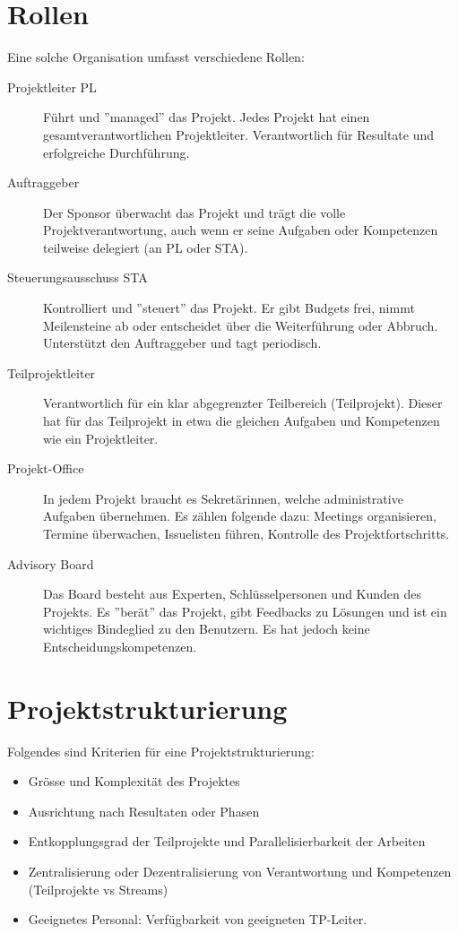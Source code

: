 \section{Rollen}
Eine solche Organisation umfasst verschiedene Rollen:
\begin{description}
	\item[Projektleiter PL] Führt und ''managed'' das Projekt. Jedes Projekt hat einen gesamtverantwortlichen Projektleiter. Verantwortlich für Resultate und erfolgreiche Durchführung.
	\item[Auftraggeber] Der Sponsor überwacht das Projekt und trägt die volle Projektverantwortung, auch wenn er seine Aufgaben oder Kompetenzen teilweise delegiert (an PL oder STA).
	\item[Steuerungsausschuss STA] Kontrolliert und ''steuert'' das Projekt. Er gibt Budgets frei, nimmt Meilensteine ab oder entscheidet über die Weiterführung oder Abbruch. Unterstützt den Auftraggeber und tagt periodisch.
	\item[Teilprojektleiter] Verantwortlich für ein klar abgegrenzter Teilbereich (Teilprojekt). Dieser hat für das Teilprojekt in etwa die gleichen Aufgaben und Kompetenzen wie ein Projektleiter.
	\item[Projekt-Office] In jedem Projekt braucht es Sekretärinnen, welche administrative Aufgaben übernehmen. Es zählen folgende dazu: Meetings organisieren, Termine überwachen, Issuelisten führen, Kontrolle des Projektfortschritts.
	\item[Advisory Board] Das Board besteht aus Experten, Schlüsselpersonen und Kunden des Projekts. Es ''berät'' das Projekt, gibt Feedbacks zu Lösungen und ist ein wichtiges Bindeglied zu den Benutzern. Es hat jedoch keine Entscheidungskompetenzen.
\end{description}

\section{Projektstrukturierung}
\label{sec:projektstrukturierung}
Folgendes sind Kriterien für eine Projektstrukturierung:
\begin{itemize}
	\item Grösse und Komplexität des Projektes
	\item Ausrichtung nach Resultaten oder Phasen
	\item Entkopplungsgrad der Teilprojekte und Parallelisierbarkeit der Arbeiten
	\item Zentralisierung oder Dezentralisierung von Verantwortung und Kompetenzen (Teilprojekte vs Streams)
	\item Geeignetes Personal: Verfügbarkeit von geeigneten TP-Leiter.
\end{itemize}

